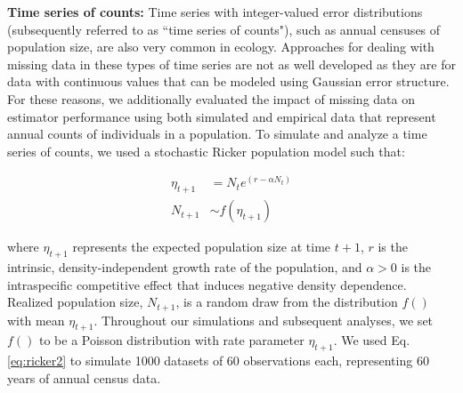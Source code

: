 \documentclass[12pt,english]{article} %
\begin{document}
\begin{linenumbers}
\begin{spacing}{1.9}
\begin{flushleft}


\textbf{Time series of counts:} Time series with integer-valued error distributions (subsequently referred to as ``time series of counts"), such as annual censuses of population size, are also very common in ecology. Approaches for dealing with missing data in these types of time series are not as well developed as they are for data with continuous values that can be modeled using Gaussian error structure. For these reasons, we additionally evaluated the impact of missing data on estimator performance using both simulated and empirical data that represent annual counts of individuals in a population. To simulate and analyze a time series of counts, we used a stochastic Ricker population model \citep{ricker1954stock} such that:

\vspace{-4em}

\begin{subequations}
\begin{align} \label{eq:ricker2}
    \eta_{t+1} &= N_t e^{(r - \alpha N_t)}\\
    N_{t+1} &\sim f(\eta_{t+1})
\end{align}
\end{subequations}

\vspace{-1em}

\noindent where $\eta_{t+1}$ represents the expected population size at time $t+1$, $r$ is the intrinsic, density-independent growth rate of the population, and $\alpha > 0$ is the intraspecific competitive effect that induces negative density dependence. %
Realized population size, $N_{t+1}$, is a random draw from the distribution $f()$ with mean $\eta_{t+1}$. Throughout our simulations and subsequent analyses, we set $f()$ to be a Poisson distribution with rate parameter $\eta_{t+1}$.%
We used Eq. \ref{eq:ricker2} to simulate 1000 datasets of 60 observations each, representing 60 years of annual census data. 


\end{flushleft}
\end{spacing}
\end{linenumbers}
\end{document}
